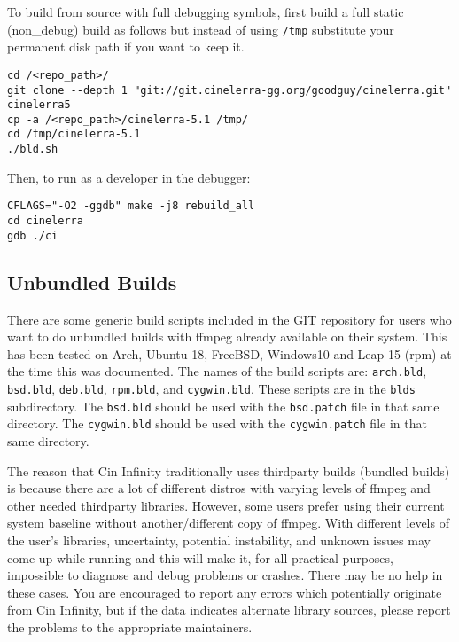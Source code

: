 To build from source with full debugging symbols, first build a full
static (non\_debug) build as follows but instead of using
\texttt{/tmp} substitute your permanent disk path if you want to
keep it.

\begin{lstlisting}[style=sh]
cd /<repo_path>/
git clone --depth 1 "git://git.cinelerra-gg.org/goodguy/cinelerra.git" cinelerra5 
cp -a /<repo_path>/cinelerra-5.1 /tmp/
cd /tmp/cinelerra-5.1
./bld.sh
\end{lstlisting}

Then, to run as a developer in the debugger:

\begin{lstlisting}[style=sh]
CFLAGS="-O2 -ggdb" make -j8 rebuild_all
cd cinelerra
gdb ./ci
\end{lstlisting}


\subsection{Unbundled Builds}%
\label{sub:unbundled_builds}

There are some generic build scripts included in the \CGG{} GIT
repository for users who want to do unbundled builds with ffmpeg
already available on their system.  This has been tested on Arch,
Ubuntu 18, FreeBSD, Windows10 and Leap 15 (rpm) at the time this
was documented.
%
The names of the build scripts are: \texttt{arch.bld},
\texttt{bsd.bld}, \texttt{deb.bld}, \texttt{rpm.bld}, and
\texttt{cygwin.bld}.  These scripts are in the \texttt{blds}
subdirectory.  The \texttt{bsd.bld} should be used with the
\texttt{bsd.patch} file in that same directory.  The
\texttt{cygwin.bld} should be used with the \texttt{cygwin.patch}
file in that same directory.

The reason that Cin Infinity traditionally uses thirdparty builds
(bundled builds) is because there are a lot of different distros
with varying levels of ffmpeg and other needed thirdparty
libraries.  However, some users prefer using their current system
baseline without another/different copy of ffmpeg.
%
With different levels of the user’s libraries, uncertainty,
potential instability, and unknown issues may come up while
running \CGG{} and this will make it, for all practical purposes,
impossible to diagnose and debug problems or crashes.
%
There may be no help in these cases.  You are encouraged to report
any errors which potentially originate from Cin Infinity, but if
the data indicates alternate library sources, please report the
problems to the appropriate maintainers.

